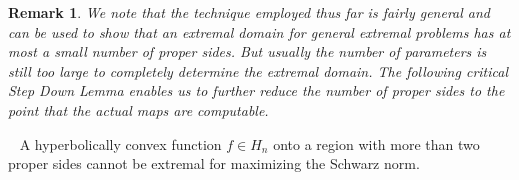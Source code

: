 \documentclass{lms}
\newcommand{\K}{\mathcal K}
\newtheorem{step-down}{Step Down Lemma}
\newtheorem{remark}[theorem]{Remark}
\DeclareMathOperator{\re}{Re}
\numberwithin{equation}{section}
\begin{document}
\begin{remark}  We note that the technique employed thus far is fairly 
general and can be used to show that an extremal domain for
general extremal problems has at most a small number of proper sides. 
But usually the number of parameters is still too large to
completely determine the extremal domain.  The following critical
Step Down Lemma enables us to further reduce the number of proper sides 
to the point that the actual maps are computable.
\end{remark}




\begin{step-down*}~\label{L:2sides}
A hyperbolically convex function $f\in H_n$  onto a region with
more than two proper sides cannot be extremal for maximizing 
the Schwarz norm.
\end{step-down*}
\end{document}
